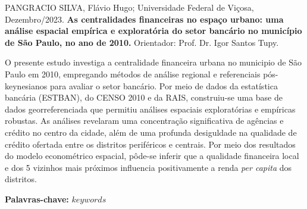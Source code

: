 \begin{spacing}{1.0}
\justify

\setlength{\parindent}{0pt}

PANGRACIO SILVA, Flávio Hugo; Universidade Federal de Viçosa, Dezembro/2023. \textbf{As centralidades financeiras no espaço urbano: uma análise espacial empírica e exploratória do setor bancário no município de São Paulo, no ano de 2010.} Orientador: Prof. Dr. Igor Santos Tupy.

O presente estudo investiga a centralidade financeira urbana no municipio de São Paulo em 2010, empregando métodos de análise regional e referenciais pós-keynesianos para avaliar o setor bancário. Por meio de dados da estatística bancária (ESTBAN), do CENSO 2010 e da RAIS, construiu-se uma base de dados georreferenciada que permitiu análises espaciais exploratórias e empíricas robustas. As análises revelaram uma concentração significativa de agências e crédito no centro da cidade, além de uma profunda desiguldade na qualidade de crédito ofertada entre os distritos periféricos e centrais. Por meio dos resultados do modelo econométrico espacial, pôde-se inferir que a qualidade financeira local e dos 5 vizinhos mais próximos influencia positivamente a renda \textit{per capita} dos distritos.

\textbf{Palavras-chave:} $keywords$

\setlength{\parindent}{15pt}

\end{spacing}

\newpage
\renewcommand{\listfigurename}{LISTA DE FIGURAS}
\pagestyle{fancy}
\listoffigures

\newpage
\renewcommand{\listtablename}{LISTA DE TABELAS}
\pagestyle{fancy}
\listoftables

\newpage
\renewcommand{\contentsname}{SUMÁRIO}
\pagestyle{fancy}
\tableofcontents

\newpage
{}

